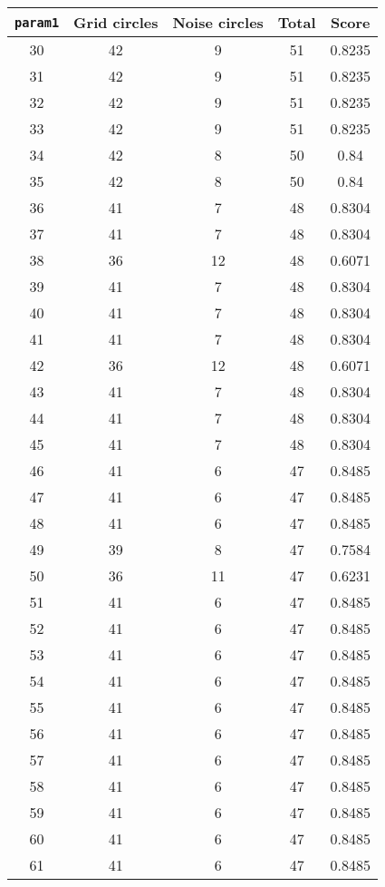 \documentclass[letterpaper, 12pt]{article}
\begin{document}
\begin{longtable}{|c|c|c|c|c|}
\hline
\textbf{\texttt{param1}} & \textbf{Grid circles} & \textbf{Noise circles} & \textbf{Total} & \textbf{Score} \\
\hline
30 & 42 & 9 & 51 & 0.8235 \\
\hline
31 & 42 & 9 & 51 & 0.8235 \\
\hline
32 & 42 & 9 & 51 & 0.8235 \\
\hline
33 & 42 & 9 & 51 & 0.8235 \\
\hline
34 & 42 & 8 & 50 & 0.84 \\
\hline
35 & 42 & 8 & 50 & 0.84 \\
\hline
36 & 41 & 7 & 48 & 0.8304 \\
\hline
37 & 41 & 7 & 48 & 0.8304 \\
\hline
38 & 36 & 12 & 48 & 0.6071 \\
\hline
39 & 41 & 7 & 48 & 0.8304 \\
\hline
40 & 41 & 7 & 48 & 0.8304 \\
\hline
41 & 41 & 7 & 48 & 0.8304 \\
\hline
42 & 36 & 12 & 48 & 0.6071 \\
\hline
43 & 41 & 7 & 48 & 0.8304 \\
\hline
44 & 41 & 7 & 48 & 0.8304 \\
\hline
45 & 41 & 7 & 48 & 0.8304 \\
\hline
46 & 41 & 6 & 47 & 0.8485 \\
\hline
47 & 41 & 6 & 47 & 0.8485 \\
\hline
48 & 41 & 6 & 47 & 0.8485 \\
\hline
49 & 39 & 8 & 47 & 0.7584 \\
\hline
50 & 36 & 11 & 47 & 0.6231 \\
\hline
51 & 41 & 6 & 47 & 0.8485 \\
\hline
52 & 41 & 6 & 47 & 0.8485 \\
\hline
53 & 41 & 6 & 47 & 0.8485 \\
\hline
54 & 41 & 6 & 47 & 0.8485 \\
\hline
55 & 41 & 6 & 47 & 0.8485 \\
\hline
56 & 41 & 6 & 47 & 0.8485 \\
\hline
57 & 41 & 6 & 47 & 0.8485 \\
\hline
58 & 41 & 6 & 47 & 0.8485 \\
\hline
59 & 41 & 6 & 47 & 0.8485 \\
\hline
60 & 41 & 6 & 47 & 0.8485 \\
\hline
61 & 41 & 6 & 47 & 0.8485 \\

\end{longtable}
\end{document}
